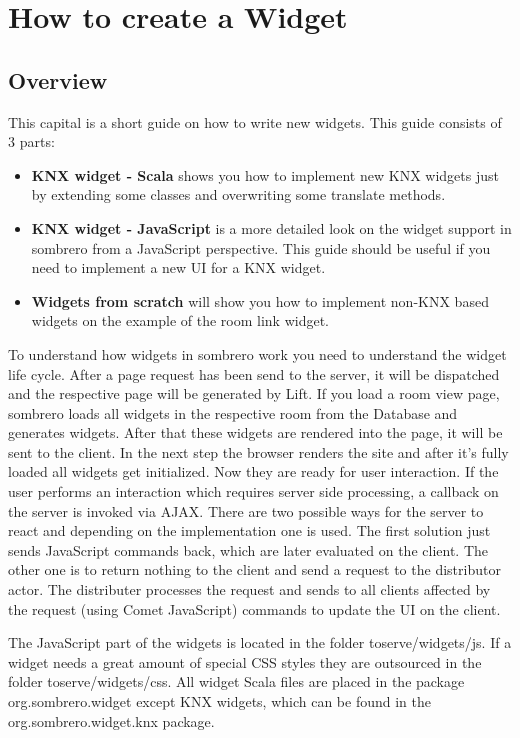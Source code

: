 \section{How to create a Widget}
\subsection{Overview}
This capital is a short guide on how to write new widgets. This guide consists of 3 parts:
\begin{itemize}
    \item \textbf{KNX widget - Scala}
        shows you how to implement new KNX widgets just by extending some classes and overwriting some translate methods.
    \item \textbf{KNX widget - JavaScript}
        is a more detailed look on the widget support in sombrero from a JavaScript perspective. This guide should be useful if you need to implement a new UI for a KNX widget.
    \item \textbf{Widgets from scratch}
         will show you how to implement non-KNX based widgets on the example of the room link widget.
\end{itemize}

To understand how widgets in sombrero work you need to understand the widget life cycle.
After a page request has been send to the server, it will be dispatched and the respective page will be generated by Lift. If you load a room view page, sombrero loads all widgets in the respective room from the Database and generates widgets. After that these widgets are rendered into the page, it will be sent to the client. In the next step the browser renders the site and after it's fully loaded all widgets get initialized. Now they are ready for user interaction. If the user performs an interaction which requires server side processing, a callback on the server is invoked via AJAX. There are two possible ways for the server to react and depending on the implementation one is used. The first solution just sends JavaScript commands back, which are later evaluated on the client. The other one is to return nothing to the client and send a request to the distributor actor. The distributer processes the request and sends to all clients affected by the request (using Comet JavaScript) commands to update the UI on the client.

The JavaScript part of the widgets is located in the folder toserve/widgets/js. If a widget needs a great amount of special CSS styles they are outsourced in the folder toserve/widgets/css. All widget Scala files are placed in the package org.sombrero.widget except KNX widgets, which can be found in the org.sombrero.widget.knx package.

